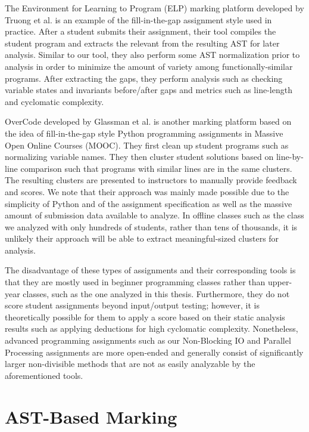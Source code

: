 The Environment for Learning to Program (ELP) marking platform developed by Truong et al. \cite{truong2004static} is an example of the fill-in-the-gap assignment style used in practice. After a student submits their assignment, their tool compiles the student program and extracts the relevant  from the resulting AST for later analysis. Similar to our tool, they also perform some AST normalization prior to analysis in order to minimize the amount of variety among functionally-similar programs. After extracting the gaps, they perform analysis such as checking variable states and invariants before/after gaps and metrics such as line-length and cyclomatic complexity.

OverCode developed by Glassman et al. \cite{glassman2015overcode} is another marking platform based on the idea of fill-in-the-gap style Python programming assignments in Massive Open Online Courses (MOOC). They first clean up student programs such as normalizing variable names. They then cluster student solutions based on line-by-line comparison such that programs with similar lines are in the same clusters. The resulting clusters are presented to instructors to manually provide feedback and scores. We note that their approach was mainly made possible due to the simplicity of Python and of the assignment specification as well as the massive amount of submission data available to analyze. In offline classes such as the class we analyzed with only hundreds of students, rather than tens of thousands, it is unlikely their approach will be able to extract meaningful-sized clusters for analysis.

The disadvantage of these types of assignments and their corresponding tools is that they are mostly used in beginner programming classes rather than upper-year classes, such as the one analyzed in this thesis. Furthermore, they do not score student assignments beyond input/output testing; however, it is theoretically possible for them to apply a score based on their static analysis results such as applying deductions for high cyclomatic complexity. Nonetheless, advanced programming assignments such as our Non-Blocking IO and Parallel Processing assignments are more open-ended and generally consist of significantly larger non-divisible methods that are not as easily analyzable by the aforementioned tools.

\section{AST-Based Marking}

